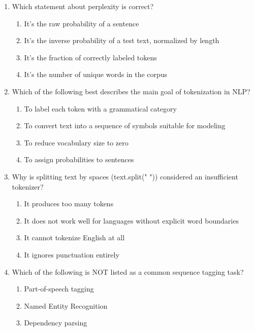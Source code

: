 \documentclass[12pt]{article}
\begin{document}
\begin{enumerate}[label=Q\arabic*.]
\begin{enumerate}[label=(\Alph*)]
    \item No previous words
    \item The previous 1 word
    \item The previous 2 words
    \item The entire sentence history
\end{enumerate}
\item Which statement about perplexity is correct?
\begin{enumerate}[label=(\Alph*)]
    \item It's the raw probability of a sentence
    \item It's the inverse probability of a test text, normalized by length
    \item It's the fraction of correctly labeled tokens
    \item It's the number of unique words in the corpus
\end{enumerate}
\item Which of the following best describes the main goal of tokenization in NLP?
\begin{enumerate}[label=(\Alph*)]
    \item To label each token with a grammatical category
    \item To convert text into a sequence of symbols suitable for modeling
    \item To reduce vocabulary size to zero
    \item To assign probabilities to sentences
\end{enumerate}
\item Why is splitting text by spaces (text.split(" ")) considered an insufficient tokenizer?
\begin{enumerate}[label=(\Alph*)]
    \item It produces too many tokens
    \item It does not work well for languages without explicit word boundaries
    \item It cannot tokenize English at all
    \item It ignores punctuation entirely
\end{enumerate}
\item Which of the following is NOT listed as a common sequence tagging task?
\begin{enumerate}[label=(\Alph*)]
    \item Part-of-speech tagging
    \item Named Entity Recognition
    \item Dependency parsing

\end{enumerate}
\end{enumerate}
\end{document}
